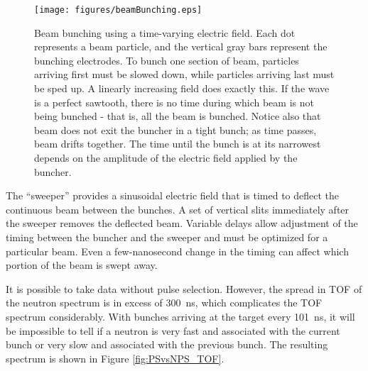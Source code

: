 \begin{figure}[htp]
\centering
\texttt{[image: figures/beamBunching.eps]}
\caption[Beam bunching.]{Beam bunching using a time-varying electric field.  Each dot represents a beam particle, and the vertical gray bars represent the bunching electrodes.  To bunch one section of beam, particles arriving first must be slowed down, while particles arriving last must be sped up.  A linearly increasing field does exactly this.  If the wave is a perfect sawtooth, there is no time during which beam is not being bunched - that is, all the beam is bunched.  Notice also that beam does not exit the buncher in a tight bunch; as time passes, beam drifts together.  The time until the bunch is at its narrowest depends on the amplitude of the electric field applied by the buncher.}
\label{fig:bunching}
\end{figure}

The ``sweeper'' provides a sinusoidal electric field that is timed to deflect the continuous beam between the bunches.  A set of vertical slits immediately after the sweeper removes the deflected beam.  Variable delays allow adjustment of the timing between the buncher and the sweeper and must be optimized for a particular beam.  Even a few-nanosecond change in the timing can affect which portion of the beam is swept away. 


It is possible to take data without pulse selection.  However, the spread in TOF of the neutron spectrum is in excess of 300~ns, which complicates the TOF spectrum considerably.  With bunches arriving at the target every 101~ns, it will be impossible to tell if a neutron is very fast and associated with the current bunch or very slow and associated with the previous bunch.  The resulting spectrum is shown in Figure \ref{fig:PSvsNPS_TOF}.

